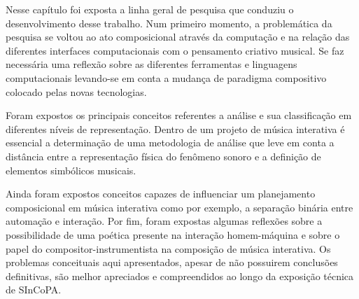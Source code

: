 \documentclass{ppgmus}
\begin{document}

Nesse capítulo foi exposta a linha geral de pesquisa que conduziu
o desenvolvimento desse trabalho.
Num primeiro momento, a problemática da pesquisa se voltou ao ato composicional
através da computação e na relação das diferentes interfaces computacionais
com o pensamento criativo musical. Se faz necessária uma reflexão sobre
as diferentes ferramentas e linguagens computacionais levando-se em conta
a mudança de paradigma compositivo colocado pelas novas tecnologias.

Foram expostos os principais conceitos referentes a análise e sua
classificação em diferentes níveis de representação.
Dentro de um projeto de música interativa é essencial a determinação de uma
metodologia de análise que leve em conta a distância entre a representação
física do fenômeno sonoro e a definição de elementos simbólicos musicais.

Ainda foram expostos conceitos capazes de influenciar um planejamento
composicional em música interativa como por exemplo, a separação binária entre
automação e interação. Por fim, foram expostas algumas reflexões sobre a
possibilidade de uma poética presente na interação homem-máquina e sobre
o papel do compositor-instrumentista na composição de música interativa.
Os problemas conceituais aqui apresentados, apesar de não possuirem
conclusões definitivas, são melhor apreciados e compreendidos ao longo
da exposição técnica de SInCoPA.
\end{document}
